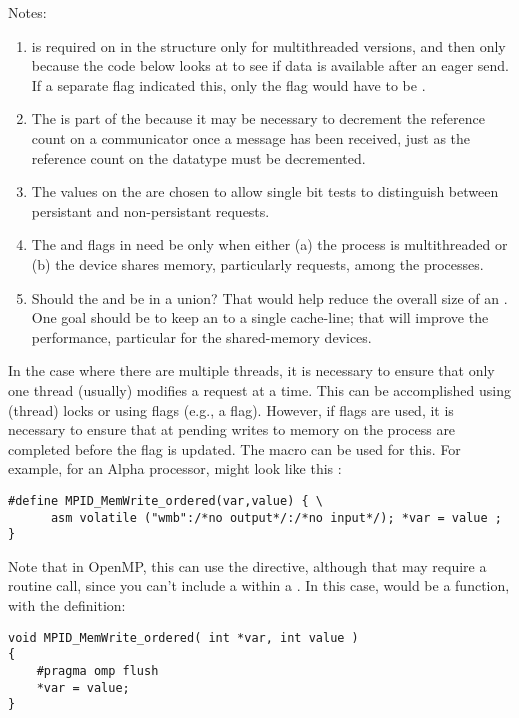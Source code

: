 Notes:
\begin{enumerate}
\item {} is required on  in the 
  structure only for multithreaded versions, and then only because the code
  below looks at  to see if data is available after an eager send.
  If a separate flag indicated this, only the flag would have to be
  . 

\item The  is part of the  because it may
  be necessary to decrement the reference count on a communicator once a
  message has been received, just as the reference count on the datatype must
  be decremented.  

\item The values on the  are chosen to allow single
  bit tests to distinguish between persistant and non-persistant requests.

\item The  and  flags in  need be
   only when either (a) the process is multithreaded or (b) the
  device shares memory, particularly requests, among the processes.

\item Should the  and  be in a
  union?  That would help reduce the overall size of an .
  One goal should be to keep an  to a single cache-line;
  that will improve the performance, particular for the shared-memory devices.
\end{enumerate}

In the case where there are multiple threads, it is necessary to ensure that
only one thread (usually) modifies a request at a time.  This can be
accomplished using (thread) locks or using flags (e.g., a  flag).
However, if flags are used, it is necessary to ensure that at pending writes
to memory on the process are completed before the flag is updated.  The macro
 can be used for this.  
For example, for an Alpha processor,  
might look like this \cite{alpha-asm}:
\begin{verbatim}
#define MPID_MemWrite_ordered(var,value) { \
      asm volatile ("wmb":/*no output*/:/*no input*/); *var = value ; }
\end{verbatim}

Note that in OpenMP, this can use the  directive, although that
may require a routine call, since you can't include a \code{\#pragma} within a
\code{\#define}.  In this case, \mpidfunc{MPID_MemWrite_ordered} would be a
function, with the definition:
\begin{verbatim}
void MPID_MemWrite_ordered( int *var, int value )
{
    #pragma omp flush
    *var = value;
}
\end{verbatim}

